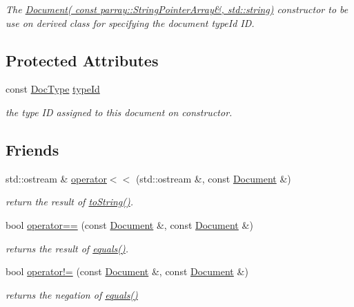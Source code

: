 \begin{DoxyCompactItemize}
\begin{DoxyCompactList}\small\item\em The \hyperlink{classdocs_1_1Document_aa9c1a4e9b6aab58e8e28b16a2888e601}{Document( const parray\-::\-String\-Pointer\-Array\&, std\-::string)} constructor to be use on derived class for specifying the document type\-Id I\-D. \end{DoxyCompactList}\end{DoxyCompactItemize}
\subsection*{Protected Attributes}
\begin{DoxyCompactItemize}
\item 
\hypertarget{classdocs_1_1Document_ad5250ef4bd98928dfbe6243162536389}{const \hyperlink{classdocs_1_1DocType}{Doc\-Type} \hyperlink{classdocs_1_1Document_ad5250ef4bd98928dfbe6243162536389}{type\-Id}}\label{classdocs_1_1Document_ad5250ef4bd98928dfbe6243162536389}

\begin{DoxyCompactList}\small\item\em the type I\-D assigned to this document on constructor. \end{DoxyCompactList}\end{DoxyCompactItemize}
\subsection*{Friends}
\begin{DoxyCompactItemize}
\item 
std\-::ostream \& \hyperlink{classdocs_1_1Document_a801e6c851261e550881c632d31407c55}{operator$<$$<$} (std\-::ostream \&, const \hyperlink{classdocs_1_1Document}{Document} \&)
\begin{DoxyCompactList}\small\item\em return the result of \hyperlink{classdocs_1_1Document_a16db383045038b779eb489ad125ef02b}{to\-String()}. \end{DoxyCompactList}\item 
bool \hyperlink{classdocs_1_1Document_aba6a95005cddfc7e9b668de3b0160cc6}{operator==} (const \hyperlink{classdocs_1_1Document}{Document} \&, const \hyperlink{classdocs_1_1Document}{Document} \&)
\begin{DoxyCompactList}\small\item\em returns the result of \hyperlink{classdocs_1_1Document_ad86b3a7c7d496f3b05c740e2c1433c78}{equals()}. \end{DoxyCompactList}\item 
bool \hyperlink{classdocs_1_1Document_abda12a8e6c13277b760c0e40efa44695}{operator!=} (const \hyperlink{classdocs_1_1Document}{Document} \&, const \hyperlink{classdocs_1_1Document}{Document} \&)
\begin{DoxyCompactList}\small\item\em returns the negation of \hyperlink{classdocs_1_1Document_ad86b3a7c7d496f3b05c740e2c1433c78}{equals()} \end{DoxyCompactList}\end{DoxyCompactItemize}


